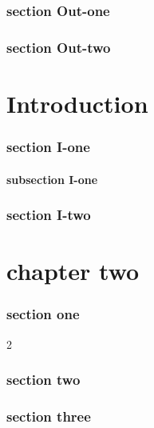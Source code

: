\documentclass{beamer}
\begin{document}

\section{section Out-one}\begin{frame}\end{frame}
\section{section Out-two}\begin{frame}\end{frame}


\part{Introduction}

    \section{section I-one}
        \subsection{subsection I-one}\begin{frame}\end{frame}
    \section{section I-two}\begin{frame}\end{frame}


\part{chapter two}

    \section{section one}\begin{frame}2\end{frame}
    \section{section two}\begin{frame}\end{frame}
    \section{section three}\begin{frame}\end{frame}
\end{document}
